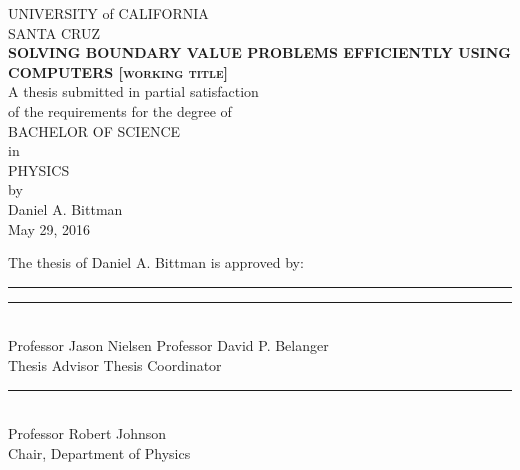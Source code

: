 \documentclass[12pt]{article}
\begin{document}
\begin{center}

	UNIVERSITY of CALIFORNIA\\
	\vspace{2mm}
	SANTA CRUZ\\
	\vspace{10mm}
	{\large\textbf{\textsc{SOLVING BOUNDARY VALUE PROBLEMS EFFICIENTLY USING COMPUTERS [working title]}}}\\
	\vspace{10mm}
	A thesis submitted in partial satisfaction\\of the requirements for the degree of\\
	\vspace{5mm}
	\textsc{BACHELOR OF SCIENCE}\\
	\vspace{3mm}
	in\\
	\vspace{3mm}
	\textsc{PHYSICS}\\
	\vspace{5mm}
	by\\
	\vspace{2mm}
	Daniel A. Bittman\\
	May 29, 2016\\

	\vspace{2in}

	The thesis of Daniel A. Bittman is approved by:\\
	\vspace{1in}

	\rule{2.5in}{2pt}\hfill
	\rule{2.5in}{2pt} \\
	Professor Jason Nielsen \hfill Professor David P. Belanger\\
	Thesis Advisor \hfill Thesis Coordinator\\

	\vspace{15mm}
	\rule{2.5in}{2pt}\\
	Professor Robert Johnson\\
	Chair, Department of Physics

\end{center}

\clearpage
\setcounter{page}{1}
\renewcommand{\thepage}{\roman{page}}
\end{document}
